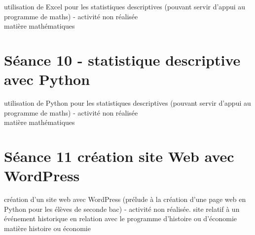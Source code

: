 \documentclass{moncours}
\begin{document}
utilisation de Excel pour les statistiques descriptives (pouvant servir d'appui au programme de maths) - activité non réalisée\\

matière mathématiques

\section{Séance 10 - statistique descriptive avec Python}

utilisation de Python pour les statistiques descriptives (pouvant servir d'appui au programme de maths) - activité non réalisée\\

matière mathématiques

\section{Séance 11 création site Web avec WordPress}

création d'un site web avec WordPress (prélude à la création d'une page web en Python pour les élèves de seconde bac) - activité non réalisée. site relatif à un événement historique en relation avec le programme d'histoire ou d'économie\\

matière histoire ou économie










\printindex %
\end{document}

